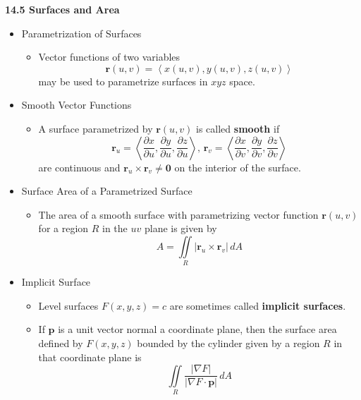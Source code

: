 \documentclass[12pt]{article}
\renewcommand{\vec}[1]{\mathbf{#1}}
\newcommand{\<}{\left<}
\renewcommand{\>}{\right>}
\begin{document}
  \newpage
  
  \centerline{\bf 14.5 Surfaces and Area}
  
  \begin{itemize}
    
  \item Parametrization of Surfaces
  
    \begin{itemize}
    \item Vector functions of two variables \[\vec{r}(u,v)=\<x(u,v),y(u,v),z(u,v)\>\] may be used to parametrize surfaces in $xyz$ space.
    \end{itemize}
    
  \item Smooth Vector Functions
  
    \begin{itemize}
    \item A surface parametrized by $\vec{r}(u,v)$ is called \textbf{smooth} if 
      \[\vec{r}_u = \<\frac{\partial x}{\partial u},\frac{\partial y}{\partial u},\frac{\partial z}{\partial u}\>,\, \vec{r}_v = \<\frac{\partial x}{\partial v},\frac{\partial y}{\partial v},\frac{\partial z}{\partial v}\>\]
    are continuous and $\vec{r}_u\times\vec{r}_v\not= \vec{0}$ on the interior of the surface. 
    \end{itemize}
    
  \item Surface Area of a Parametrized Surface
  
    \begin{itemize}
    \item The area of a smooth surface with parametrizing vector function $\vec{r}(u,v)$ for a region $R$ in the $uv$ plane is given by \[A = \iint\limits_R |\vec{r}_u\times\vec{r}_v|\,dA\]
    \end{itemize}
    
  \item Implicit Surface
  
    \begin{itemize}
    \item Level surfaces $F(x,y,z)=c$ are sometimes called \textbf{implicit surfaces}.
    \item If $\vec{p}$ is a unit vector normal a coordinate plane, then the surface area defined by $F(x,y,z)$ bounded by the cylinder given by a region $R$ in that coordinate plane is \[\iint\limits_R \frac{|\nabla F|}{|\nabla F \cdot \vec{p}|}\,dA\]
    \end{itemize}
    

\end{itemize}
\end{document}
